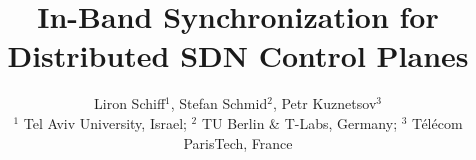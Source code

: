 \documentclass[conference]{sigcomm-alternate}
\begin{document}
\sloppy





\title{In-Band Synchronization for\\Distributed SDN Control Planes}




\author{
Liron Schiff$^1$, %
Stefan Schmid$^2$, Petr Kuznetsov$^3$ \\
\small $^1$ Tel Aviv University, Israel; $^2$ TU Berlin \& T-Labs,
Germany; $^3$ T\'el\'ecom ParisTech, France
}


\date{}


\maketitle


\thispagestyle{empty}


\end{document}
